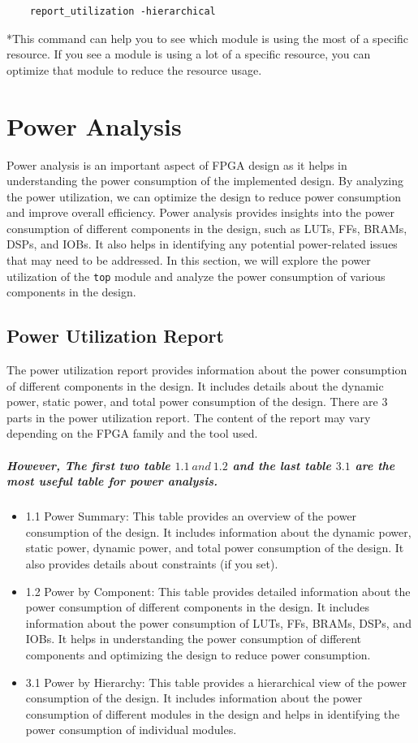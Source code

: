 \documentclass{report}
\begin{document}
\begin{verbatim}
    report_utilization -hierarchical
\end{verbatim}

*This command can help you to see which module is using the most of a specific resource. If you see a module is using a lot of a specific resource, you can optimize that module to reduce the resource usage.

\chapter{Power Analysis}
Power analysis is an important aspect of FPGA design as it helps in understanding the power consumption of the implemented design. By analyzing the power utilization, we can optimize the design to reduce power consumption and improve overall efficiency. Power analysis provides insights into the power consumption of different components in the design, such as LUTs, FFs, BRAMs, DSPs, and IOBs. It also helps in identifying any potential power-related issues that may need to be addressed. In this section, we will explore the power utilization of the \texttt{top} module and analyze the power consumption of various components in the design.

\section{Power Utilization Report}
The power utilization report provides information about the power consumption of different components in the design. It includes details about the dynamic power, static power, and total power consumption of the design. 
There are 3 parts in the power utilization report. The content of the report may vary depending on the FPGA family and the tool used. \paragraph{However, The first two table \(1.1\ and\  1.2\) and the last table \(3.1\) are the most useful table for power analysis.} 
\begin{itemize}
    \item 1.1 Power Summary: This table provides an overview of the power consumption of the design. It includes information about the dynamic power, static power, dynamic power, and total power consumption of the design. It also provides details about constraints (if you set).
    \item 1.2 Power by Component: This table provides detailed information about the power consumption of different components in the design. It includes information about the power consumption of LUTs, FFs, BRAMs, DSPs, and IOBs. It helps in understanding the power consumption of different components and optimizing the design to reduce power consumption.
    \item 3.1 Power by Hierarchy: This table provides a hierarchical view of the power consumption of the design. It includes information about the power consumption of different modules in the design and helps in identifying the power consumption of individual modules.
\end{itemize}
\end{document}
